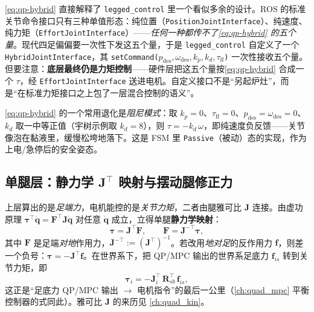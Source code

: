 \begin{insight}\label{ins:qp-hybrid-iface}
\cref{eq:qp-hybrid} 直接解释了 \texttt{legged\_control} 里一个看似多余的设计。ROS 的标准关节命令接口只有三种单值形态：纯位置（\texttt{PositionJointInterface}）、纯速度、纯力矩（\texttt{EffortJointInterface}）——\emph{任何一种都传不了\cref{eq:qp-hybrid} 的五个量}。现代四足偏偏要一次性下发这五个量，于是 \texttt{legged\_control} 自定义了一个 \texttt{HybridJointInterface}，其 \texttt{setCommand($p_{\mathrm{des}},\omega_{\mathrm{des}},k_p,k_d,\tau_{\mathrm{ff}}$)} 一次性接收五个量。但要注意：\textbf{底层最终仍是力矩控制}——硬件层把这五个量按\cref{eq:qp-hybrid} 合成一个 $\tau$，经 \texttt{EffortJointInterface} 送进电机。自定义接口不是“另起炉灶”，而是“在标准力矩接口之上包了一层混合控制的语义”。
\end{insight}

\begin{note}\label{note:qp-damping}
\cref{eq:qp-hybrid} 的一个常用退化是\emph{阻尼模式}：取 $k_p{=}0$、$\tau_{\mathrm{ff}}{=}0$、$p_{\mathrm{des}}{=}\omega_{\mathrm{des}}{=}0$、$k_d$ 取一中等正值（宇树示例取 $k_d{=}8$），则 $\tau=-k_d\,\omega$，即纯速度负反馈——关节像泡在黏液里，缓慢松垮地落下\cite{unitree2023quadruped}。这是 FSM 里 \texttt{Passive}（被动）态的实现，作为上电/急停后的安全姿态。
\end{note}

\subsection{单腿层：静力学 \texorpdfstring{$\mathbf{J}^\top$}{J^T} 映射与摆动腿修正力}
\label{subsec:qp-leg}

上层算出的是\emph{足端力}，电机能控的是\emph{关节力矩}，二者由腿雅可比 $\mathbf{J}$ 连接。由虚功原理 $\boldsymbol{\tau}^\top\dot{\boldsymbol{q}}=\boldsymbol{F}^\top\mathbf{J}\dot{\boldsymbol{q}}$ 对任意 $\dot{\boldsymbol{q}}$ 成立，立得单腿\textbf{静力学映射}\cite{unitree2023quadruped}：
\begin{equation}
  \boldsymbol{\tau}=\mathbf{J}^\top\boldsymbol{F},
  \qquad
  \boldsymbol{F}=\mathbf{J}^{-\top}\boldsymbol{\tau},
  \label{eq:qp-jacobian-force}
\end{equation}
其中 $\boldsymbol{F}$ 是足端\emph{对地}作用力，$\mathbf{J}^{-\top}:=(\mathbf{J}^\top)^{-1}$。若改用\emph{地对足}的反作用力 $\boldsymbol{f}$，则差一个负号：$\boldsymbol{\tau}=-\mathbf{J}^\top\boldsymbol{f}$。在世界系下，把 QP/MPC 输出的世界系足底力 $\boldsymbol{f}_{is}$ 转到关节力矩，即\cite{unitree2023quadruped}
\begin{equation}
  \boldsymbol{\tau}_i=-\mathbf{J}_i^\top\,\mathbf{R}_{sb}^\top\,\boldsymbol{f}_{is},
  \label{eq:qp-grf-to-torque}
\end{equation}
这正是“足底力 QP/MPC 输出 $\to$ 电机指令”的最后一公里（\cref{ch:quad_mpc} 平衡控制器的式同此）。雅可比 $\mathbf{J}$ 的来历见 \cref{ch:quad_kin}。

